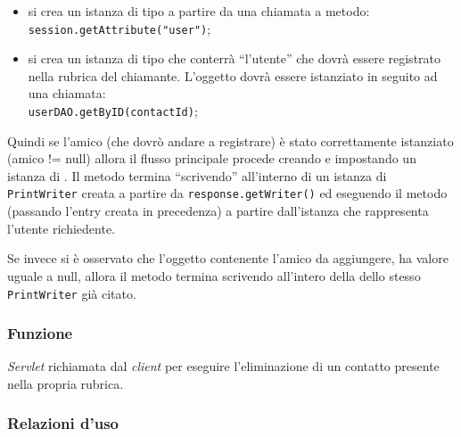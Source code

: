 \begin{description}
\begin{itemize}
		\item si crea un istanza di tipo  a partire da una chiamata a metodo:\\
		\verb|session.getAttribute("user")|;
		
		\item si crea un istanza di tipo  che conterrà ``l'utente'' che dovrà essere registrato nella rubrica del chiamante. L'oggetto dovrà essere istanziato in seguito ad una chiamata:\\
		\verb|userDAO.getByID(contactId)|;
	\end{itemize}
	Quindi se l'amico (che dovrò andare a registrare) è stato correttamente istanziato (amico != null) allora il flusso principale procede creando e impostando un istanza di . Il metodo termina ``scrivendo''  all'interno di un istanza di \texttt{PrintWriter} creata a partire da \texttt{response.getWriter()} ed eseguendo il metodo  (passando l'entry creata in precedenza) a partire dall'istanza che rappresenta l'utente richiedente.
	
	Se invece si è osservato che l'oggetto contenente l'amico da aggiungere, ha valore uguale a null, allora il metodo termina scrivendo  all'intero della dello stesso \texttt{PrintWriter} già citato.
\end{description}



\subsubsection*{Funzione}
\textit{Servlet} richiamata dal \textit{client} per eseguire l'eliminazione di un contatto presente nella propria rubrica.

\subsubsection*{Relazioni d'uso}

